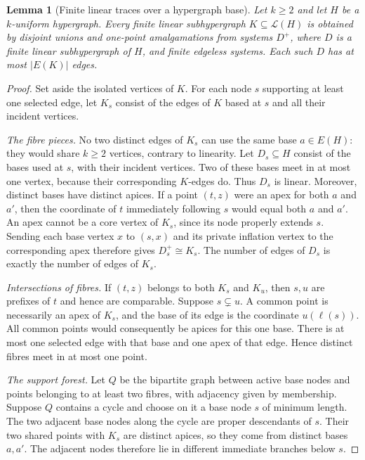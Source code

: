 \documentclass[a4paper,11pt,reqno]{amsart}
\newcommand{\proofpart}[1]{%
  \par\smallskip\noindent\textit{#1.}\enspace\ignorespaces}
\theoremstyle{plain}
\newtheorem{lemma}[theorem]{Lemma}
\theoremstyle{definition}
\theoremstyle{remark}
\begin{document}
\begin{lemma}[Finite linear traces over a hypergraph base]
\label{uniform-lift-trace}
Let $k\ge2$ and let $H$ be a $k$-uniform hypergraph.  Every finite linear
subhypergraph $K\subseteq\mathcal L(H)$ is obtained by disjoint unions and
one-point amalgamations from systems $D^+$, where $D$ is a finite linear
subhypergraph of $H$, and finite edgeless systems.  Each such $D$ has at most
$|E(K)|$ edges.
\end{lemma}
\begin{proof}
Set aside the isolated vertices of $K$.  For each node $s$ supporting at
least one selected edge, let $K_s$ consist of the edges of $K$ based at $s$
and all their incident vertices.

\proofpart{The fibre pieces}
No two distinct edges of $K_s$ can use the same base $a\in E(H)$: they
would share $k\ge2$ vertices, contrary to linearity.  Let $D_s\subseteq H$
consist of the bases used at $s$, with their incident vertices.  Two of
these bases meet in at most one vertex, because their corresponding
$K$-edges do.  Thus $D_s$ is linear.  Moreover, distinct bases have distinct
apices.  If a point $(t,z)$ were an apex for both $a$ and $a'$, then the
coordinate of $t$ immediately following $s$ would equal both $a$ and $a'$.
An apex cannot be a core vertex of $K_s$, since its node properly extends
$s$.  Sending each base vertex $x$ to $(s,x)$ and its private inflation
vertex to the corresponding apex therefore gives $D_s^+\cong K_s$.
The number of edges of $D_s$ is exactly the number of edges of $K_s$.

\proofpart{Intersections of fibres}
If $(t,z)$ belongs to both $K_s$ and $K_u$, then $s,u$ are prefixes of $t$
and hence are comparable.  Suppose $s\subsetneq u$.  A common point is
necessarily an apex of $K_s$, and the base of its edge is the coordinate
$u(\ell(s))$.  All common points would consequently be apices for this one
base.  There is at most one selected edge with that base and one apex of
that edge.  Hence distinct fibres meet in at most one point.

\proofpart{The support forest}
Let $Q$ be the bipartite graph between active base nodes and points
belonging to at least two fibres, with adjacency given by membership.
Suppose $Q$ contains a cycle and choose on it a base node $s$ of minimum
length.  The two adjacent base nodes along the cycle are proper descendants
of $s$.  Their two shared points with $K_s$ are distinct apices, so they
come from distinct bases $a,a'$.  The adjacent nodes therefore lie in
different immediate branches below $s$.


\end{proof}
\end{document}
